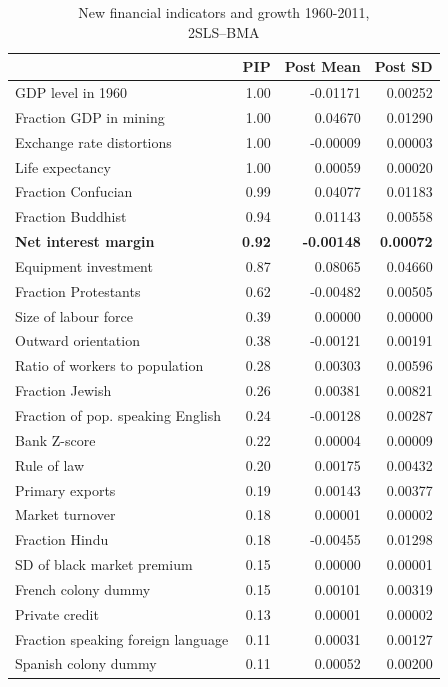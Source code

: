 \begin{refsection}
\begin{table}[!htbp]
	\centering
	\caption{New financial indicators and growth 1960-2011, \\ 2SLS--BMA}
	\label{ch2tab:all6011hypIValt}
	\small
	\begin{tabular}{lrrr}
	 	  \toprule
		  & PIP & Post Mean & Post SD \\ 
		  \midrule
		  GDP level in 1960 & 1.00 & -0.01171 & 0.00252 \\
  Fraction GDP in mining & 1.00 & 0.04670 & 0.01290 \\ 
  Exchange rate distortions & 1.00 & -0.00009 & 0.00003 \\
  Life expectancy & 1.00 & 0.00059 & 0.00020 \\ 
  Fraction Confucian & 0.99 & 0.04077 & 0.01183 \\ 
  Fraction Buddhist & 0.94 & 0.01143 & 0.00558 \\
  \textbf{Net interest margin} & \textbf{0.92} & \textbf{-0.00148} & \textbf{0.00072} \\
  Equipment investment & 0.87 & 0.08065 & 0.04660 \\
  Fraction Protestants & 0.62 & -0.00482 & 0.00505 \\ 
  Size of labour force & 0.39 & 0.00000 & 0.00000 \\
  Outward orientation & 0.38 & -0.00121 & 0.00191 \\
  Ratio of workers to population & 0.28 & 0.00303 & 0.00596 \\ 
  Fraction Jewish & 0.26 & 0.00381 & 0.00821 \\ 
  Fraction of pop. speaking English & 0.24 & -0.00128 & 0.00287 \\ 
  Bank Z-score & 0.22 & 0.00004 & 0.00009 \\ 
  Rule of law & 0.20 & 0.00175 & 0.00432 \\ 
  Primary exports & 0.19 & 0.00143 & 0.00377 \\
  Market turnover & 0.18 & 0.00001 & 0.00002 \\ 
  Fraction Hindu & 0.18 & -0.00455 & 0.01298 \\ 
  SD of black market premium & 0.15 & 0.00000 & 0.00001 \\ 
  French colony dummy & 0.15 & 0.00101 & 0.00319 \\ 
  Private credit & 0.13 & 0.00001 & 0.00002 \\ 
  Fraction speaking foreign language & 0.11 & 0.00031 & 0.00127 \\ 
  Spanish colony dummy & 0.11 & 0.00052 & 0.00200 \\ 

\end{tabular}
\end{table}
\end{refsection}

